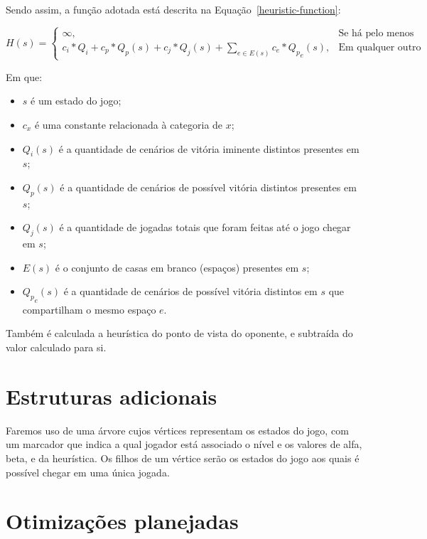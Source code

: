 \documentclass{article}
\begin{document}
    Sendo assim, a função adotada está descrita na Equação~\ref{heuristic-function}:

    \begin{equation}
        H(s) = \begin{cases}
            \infty, & \mbox{Se há pelo menos um cenário de vitória} \\
            c_i * Q_i + c_p * Q_p(s) + c_j * Q_j(s) + \sum_{e\in E(s)} c_e * {Q_p}_e(s), & \mbox{Em qualquer outro caso}
        \end{cases}
        \label{heuristic-function}
    \end{equation}

    Em que:

    \begin{itemize}
        \item $s$ é um estado do jogo;
        \item $c_x$ é uma constante relacionada à categoria de $x$;
        \item $Q_i(s)$ é a quantidade de cenários de vitória iminente distintos
        presentes em $s$;
        \item $Q_p(s)$ é a quantidade de cenários de possível vitória distintos
        presentes em $s$;
        \item $Q_j(s)$ é a quantidade de jogadas totais que foram feitas até o
        jogo chegar em $s$;
        \item $E(s)$ é o conjunto de casas em branco (espaços) presentes em $s$;
        \item ${Q_p}_e(s)$ é a quantidade de cenários de possível vitória
        distintos em $s$ que compartilham o mesmo espaço $e$.
    \end{itemize}

    Também é calculada a heurística do ponto de vista do oponente,
    e subtraída do valor calculado para si.

    \section{Estruturas adicionais}

    Faremos uso de uma árvore cujos vértices representam os estados do jogo,
    com um marcador que indica a qual jogador está associado o nível e os
    valores de alfa, beta, e da heurística. Os filhos de um vértice serão os
    estados do jogo aos quais é possível chegar em uma única jogada.

    \section{Otimizações planejadas}
\end{document}
